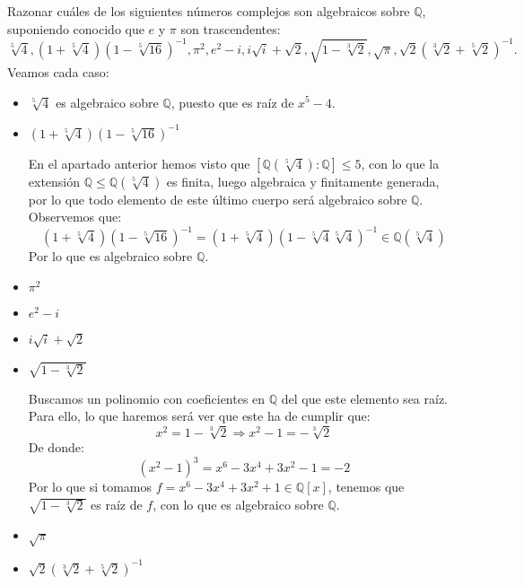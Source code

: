 \begin{ejercicio} 
    Razonar cuáles de los siguientes números complejos son algebraicos sobre $\mathbb{Q}$, suponiendo conocido que $e$ y $\pi$ son trascendentes:
    \begin{equation*}
        \sqrt[5]{4}, (1+\sqrt[5]{4}){(1-\sqrt[5]{16})}^{-1}, \pi^2, e^2-i, i\sqrt{i}+\sqrt{2}, \sqrt{1-\sqrt[3]{2}}, \sqrt{\pi}, \sqrt{2}{(\sqrt[3]{2}+\sqrt[5]{2})}^{-1}.
    \end{equation*}
    Veamos cada caso:
    \begin{itemize}
        \item $\sqrt[5]{4}$ es algebraico sobre $\mathbb{Q}$, puesto que es raíz de $x^5-4$.
        \item $\left(1+\sqrt[5]{4}\right){\left(1-\sqrt[5]{16}\right)}^{-1}$

            En el apartado anterior hemos visto que $[\mathbb{Q}\left(\sqrt[5]{4}\right) :\mathbb{Q}]\leq 5$, con lo que la extensión $\mathbb{Q}\leq \mathbb{Q}\left(\sqrt[5]{4}\right)$ es finita, luego algebraica y finitamente generada, por lo que todo elemento de este último cuerpo será algebraico sobre $\mathbb{Q}$. Observemos que:
            \begin{equation*}
                (1+\sqrt[5]{4}){\left(1-\sqrt[5]{16}\right)}^{-1} = (1+\sqrt[5]{4}){\left(1-\sqrt[5]{4}\sqrt[5]{4}\right)}^{-1} \in \mathbb{Q}(\sqrt[5]{4})
            \end{equation*}
            Por lo que es algebraico sobre $\mathbb{Q}$.
        \item $\pi^2$%
        \item $e^2-i$ %
        \item $i\sqrt{i}+\sqrt{2}$ %
        \item $\sqrt{1-\sqrt[3]{2}}$

            Buscamos un polinomio con coeficientes en $\mathbb{Q}$ del que este elemento sea raíz. Para ello, lo que haremos será ver que este ha de cumplir que:
            \begin{equation*}
                x^2 = 1-\sqrt[3]{2} \Longrightarrow x^2-1 = -\sqrt[3]{2}
            \end{equation*}
            De donde:
            \begin{equation*}
                {(x^2-1)}^{3} = x^6-3x^4+3x^2-1 = -2
            \end{equation*}
            Por lo que si tomamos $f = x^6-3x^4+3x^2+1\in \mathbb{Q}[x]$, tenemos que $\sqrt{1-\sqrt[3]{2}}$ es raíz de $f$, con lo que es algebraico sobre $\mathbb{Q}$.
        \item $\sqrt{\pi}$ %
        \item $\sqrt{2}{(\sqrt[3]{2}+\sqrt[5]{2})}^{-1}$ %
    \end{itemize}
\end{ejercicio}

